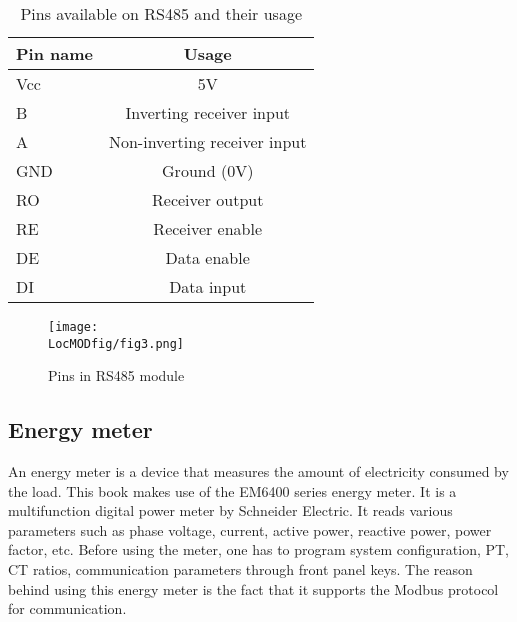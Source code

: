 \begin{table}
  \centering
  \caption{Pins available on RS485 and their usage}
  \label{tab:rs-485-pins}
  \begin{tabular}{lc}\hline
    Pin name & Usage                        \\ \hline 
    Vcc      & 5V                           \\ 
    B        & Inverting receiver input     \\ 
    A        & Non-inverting receiver input \\
    GND      & Ground (0V)                  \\ 
    RO       & Receiver output              \\ 
    RE       & Receiver enable              \\
    DE       & Data enable                  \\
    DI       & Data input                   \\ 
    \hline
  \end{tabular}
\end{table}





\begin{figure}
  \centering
  \texttt{[image: \\LocMODfig/fig3.png]}
  \caption{Pins in RS485 module}
  \label{rs-485}
\end{figure}

\subsection{Energy meter}
\label{sec:energy-meter}
An energy meter is a device that measures the amount of electricity consumed
by the load. This book makes use of the EM6400 series energy meter. It is a
multifunction digital power meter by Schneider Electric. It
reads various parameters such as phase voltage, current, active power,
reactive power, power factor, etc. Before using the meter, one has to
program system configuration, PT, CT ratios, communication parameters
through front panel keys. The reason behind using this energy meter is 
the fact that it supports the Modbus protocol for communication.

